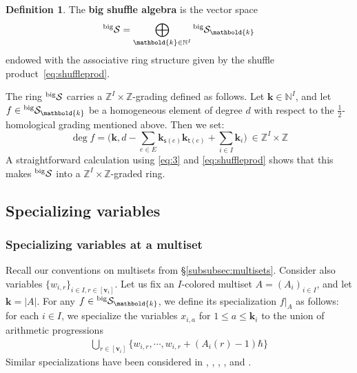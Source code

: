 \documentclass[11pt,reqno]{amsart}
\renewcommand{\mathbf}{\mathbold}
\numberwithin{equation}{section}
\theoremstyle{definition}
\newtheorem{Definition}[equation]{Definition}
\newcommand{\cS}{\mathcal{S}}
\newcommand{\bk}{\mathbf{k}}
\newcommand{\bv}{\mathbf{v}}
\newcommand{\NN}{\mathbb{N}}
\newcommand{\ZZ}{\mathbb{Z}}
\newcommand{\leftexp}[2]{\vphantom{#2}^{#1} #2}
\renewcommand{\bv}{\mathbf{v}} %
\newcommand{\source}{\mathsf{s}}
\newcommand{\target}{\mathsf{t}}
\newcommand{\vertexset}{I}
\newcommand{\arrowset}{E}
\newcommand{\preshu}{\leftexp{\mathrm{big}}{\cS}}
\begin{document}
\begin{Definition}
The {\bf big shuffle algebra} is the vector space
\begin{align}
  \label{eq:5}
  \preshu = \bigoplus_{\bk \in \NN^I} \preshu_{\bk}
\end{align}
endowed with the associative ring structure given by the shuffle product~\eqref{eq:shuffleprod}.  
\end{Definition}


The ring $\preshu$ carries a $\ZZ^\vertexset\times \ZZ$-grading defined as follows.  Let $\bk \in \NN^\vertexset$, and let  $f \in \preshu_\bk$ be a homogeneous element of degree $d$ with respect to the $\frac{1}{2}$-homological grading mentioned above.  Then we set:
\begin{equation}
    \label{eq:gradingonpreshu}
    \deg f = \Big(\bk, d - \sum_{e \in \arrowset} \bk_{\source(e)} \bk_{\target(e)} + \sum_{i \in \vertexset} \bk_i\Big) \ \in  \ZZ^\vertexset\times \ZZ
\end{equation}
A straightforward calculation using \eqref{eq:3} and \eqref{eq:shuffleprod} shows that this makes $\preshu$ into a $\ZZ^\vertexset\times \ZZ$-graded ring.



\subsection{Specializing variables}

    
\subsubsection{Specializing variables at a multiset}
Recall our conventions on multisets from \S \ref{subsubsec:multisets}. Consider also variables $\{ w_{i,r} \}_{i \in I, r \in [\bv_i]}$. Let us fix an $I$-colored multiset $A = (A_i)_{i \in \vertexset}$, and let $\bk = |A|$. For any $f \in \preshu_{\bk}$, we define its specialization $f\vert_A$ as follows: for each $i \in I$, we specialize  the variables $x_{i,a}$ for $1 \leq a \leq \bk_i$ to the union of arithmetic progressions
\begin{align}
  \label{eq:12}
  \bigcup_{r \in [\bv_i]} \{ w_{i,r} , \cdots , w_{i,r} + (A_i(r) - 1) \hbar \}
\end{align}
Similar specializations have been considered in \cite[Def.~1.6]{FHHSY}, \cite[Thm.~4.11]{FT2}, \cite[Thm.~B.17]{Frassek-Tsymbaliuk-2022},  \cite[Def.~3.1]{Negut2}, and \cite[Def.~2.5]{JN26}.
\end{document}
